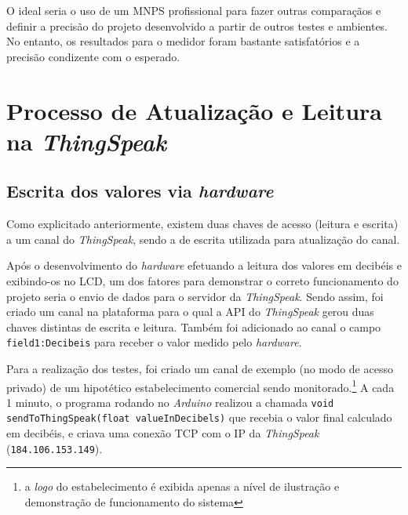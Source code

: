 \documentclass[
    12pt,               %
    openright,          %
    oneside,
    a4paper,            
    english,            %
    brazil              %
    ]{abntex2}
\begin{document}
O ideal seria o uso de um MNPS profissional para fazer outras comparaçãos e definir a precisão do projeto desenvolvido a partir de outros testes e ambientes. No entanto, os resultados para o medidor foram bastante satisfatórios e a precisão condizente com o esperado.



\section{Processo de Atualização e Leitura na \textit{ThingSpeak}}\label{things-sec}

\subsection{Escrita dos valores via \textit{hardware}}

Como explicitado anteriormente, existem duas chaves de acesso (leitura e escrita) a um canal do \textit{ThingSpeak}, sendo a de escrita utilizada para atualização do canal. 

Após o desenvolvimento do \textit{hardware} efetuando a leitura dos valores em decibéis e exibindo-os no LCD, um dos fatores para demonstrar o correto funcionamento do projeto seria o envio de dados para o servidor da \textit{ThingSpeak}. Sendo assim, foi criado um canal na plataforma para o qual a API do \textit{ThingSpeak} gerou duas chaves distintas de escrita e leitura. Também foi adicionado ao canal o campo \texttt{field1:Decibeis} para receber o valor medido pelo \textit{hardware}.

Para a realização dos testes, foi criado um canal de exemplo (no modo de acesso privado) de um hipotético estabelecimento comercial sendo monitorado.\footnote{a \textit{logo} do estabelecimento é exibida apenas a nível de ilustração e demonstração de funcionamento do sistema} A cada 1 minuto, o programa rodando no \textit{Arduino} realizou a chamada \texttt{void sendToThingSpeak(float valueInDecibels)} que recebia o valor final calculado em decibéis, e criava uma conexão TCP com o IP da \textit{ThingSpeak} (\texttt{184.106.153.149}). 
\end{document}
